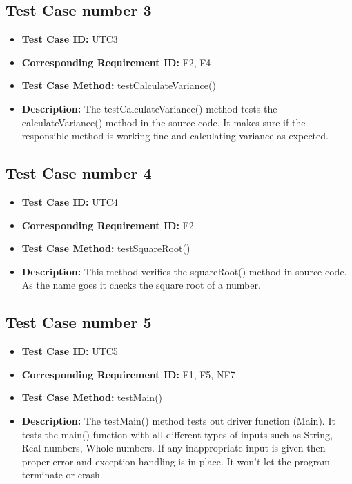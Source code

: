 \documentclass[a4paper, 12pt]{article}
\begin{document}
\subsection*{Test Case number 3}
    \begin{itemize}
        \item \textbf{Test Case ID: } UTC3
        \item \textbf{Corresponding Requirement ID: } F2, F4
        \item \textbf{Test Case Method: } testCalculateVariance()
        \item \textbf{Description: } The testCalculateVariance() method tests the calculateVariance() method in the source code. It makes sure if the responsible method is working fine and calculating variance as expected. 
    \end{itemize}
    
\subsection*{Test Case number 4}
    \begin{itemize}
        \item \textbf{Test Case ID: } UTC4
        \item \textbf{Corresponding Requirement ID: } F2
        \item \textbf{Test Case Method: } testSquareRoot()
        \item \textbf{Description: } This method verifies the squareRoot() method in source code. As the name goes it checks the square root of a number. 
    \end{itemize}

\subsection*{Test Case number 5}
    \begin{itemize}
        \item \textbf{Test Case ID: } UTC5
        \item \textbf{Corresponding Requirement ID: } F1, F5, NF7
        \item \textbf{Test Case Method: } testMain()
        \item \textbf{Description: } The testMain() method tests out driver function (Main). It tests the main() function with all different types of inputs such as String, Real numbers, Whole numbers. If any inappropriate input is given then proper error and exception handling is in place. It won't let the program terminate or crash. 
    \end{itemize}
    
\end{document}
